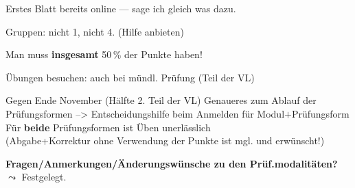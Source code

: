 \begin{frame}
{\begin{footnotesize}
          \par\smallskip
          Erstes Blatt bereits online — sage ich gleich was dazu.
  
          \par\smallskip
          Gruppen:  nicht 1, nicht 4. (Hilfe anbieten)
  
          \par\smallskip
          Man muss \textbf{insgesamt} 50\,\% der Punkte haben!
  
          \par\smallskip
          Übungen besuchen: auch bei mündl. Prüfung (Teil der VL)
  
          \par\smallskip
          Gegen Ende November (Hälfte 2. Teil der VL) Genaueres zum Ablauf der Prüfungsformen
          –> Entscheidungshilfe beim Anmelden für Modul$+$Prüfungsform \\
          Für \textbf{beide} Prüfungsformen ist Üben unerlässlich \\
          (Abgabe+Korrektur ohne Verwendung der Punkte ist mgl. und erwünscht!)
  
          \par\medskip
          \textbf{Fragen/Anmerkungen/Änderungswünsche zu den Prüf.modalitäten?}
          $\leadsto$ Festgelegt.      
          \par
        \end{footnotesize}
      }
      
    \end{frame}

